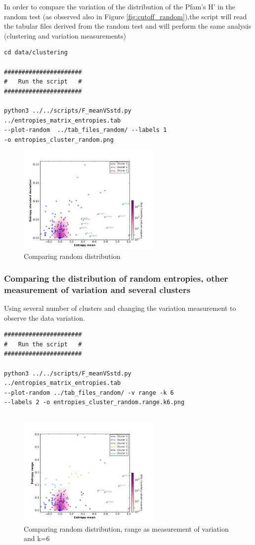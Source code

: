 \documentclass[12pt]{report}
\begin{document}
In order to compare the variation of the distribution of the Pfam's H' in the
random test (as observed also in Figure \ref{fig:cutoff_random}),the script
will read the tabular files derived from the random test and will perform the
same analysis (clustering and variation measurements) 
\begin{verbatim}
cd data/clustering

######################
#   Run the script   #
######################

python3 ../../scripts/F_meanVSstd.py  ../entropies_matrix_entropies.tab 
--plot-random  ../tab_files_random/ --labels 1 
-o entropies_cluster_random.png

\end{verbatim}
\begin{figure}[H]
  \centering
    \includegraphics[width=70mm, scale=1]{entropies_random_labels.png}
    \caption{Comparing random distribution}
        \label{fig:cluster_random}
\end{figure}

\subsubsection{Comparing the distribution of random entropies, other
measurement of variation and several clusters}
Using several number of clusters and changing the variation measurement to
observe the data variation. 

\begin{verbatim}
######################
#   Run the script   #
######################

python3 ../../scripts/F_meanVSstd.py  ../entropies_matrix_entropies.tab 
--plot-random ../tab_files_random/ -v range -k 6
--labels 2 -o entropies_cluster_random.range.k6.png


\end{verbatim}
\begin{figure}[H]
  \centering
    \includegraphics[width=70mm, scale=1]{entropies_cluster_random_range_k6.png}
    \caption{Comparing random distribution, range as measurement of variation and k=6}
        \label{fig:range_random}
\end{figure}
\end{document}

